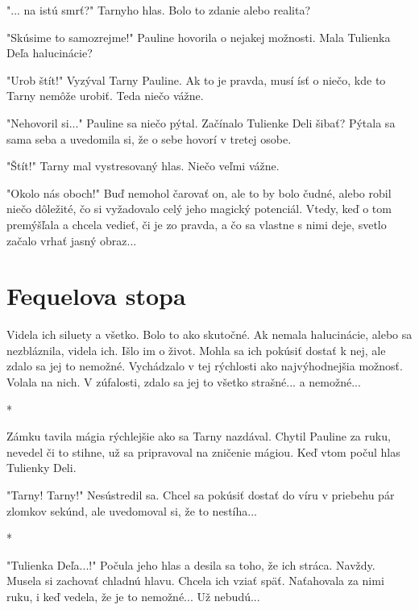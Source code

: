 \documentclass{book}
\begin{document}
"$ $... na istú smrť?"$ $  Tarnyho hlas. Bolo to zdanie alebo realita?

"$ $Skúsime to samozrejme!"$ $  Pauline hovorila o nejakej možnosti. Mala Tulienka Deľa halucinácie?

"$ $Urob štít!"$ $  Vyzýval Tarny Pauline. Ak to je pravda, musí ísť o niečo, kde to Tarny nemôže urobiť. Teda niečo vážne.

"$ $Nehovoril si..."$ $  Pauline sa niečo pýtal. Začínalo Tulienke Deli šibať? Pýtala sa sama seba a uvedomila si, že o sebe hovorí v tretej osobe.

"$ $Štít!"$ $  Tarny mal vystresovaný hlas. Niečo veľmi vážne.

"$ $Okolo nás oboch!"$ $  Buď nemohol čarovať on, ale to by bolo čudné, alebo robil niečo dôležité, čo si vyžadovalo celý jeho magický potenciál. Vtedy, keď o tom premýšľala a chcela vedieť, či je zo pravda, a čo sa vlastne s nimi deje, svetlo začalo vrhať jasný obraz...

\chapter{Fequelova stopa}

Videla ich siluety a všetko. Bolo to ako skutočné. Ak nemala halucinácie, alebo sa nezbláznila, videla ich. Išlo im o život. Mohla sa ich pokúsiť dostať k nej, ale zdalo sa jej to nemožné. Vychádzalo v tej rýchlosti ako najvýhodnejšia možnosť. Volala na nich. V zúfalosti, zdalo sa jej to všetko strašné... a nemožné...

\begin{center}

*

\end{center}

Zámku tavila mágia rýchlejšie ako sa Tarny nazdával. Chytil Pauline za ruku, nevedel či to stihne, už sa pripravoval na zničenie mágiou. Keď vtom počul hlas Tulienky Deli.

"$ $Tarny! Tarny!"$ $  Nesústredil sa. Chcel sa pokúsiť dostať do víru v priebehu pár zlomkov sekúnd, ale uvedomoval si, že to nestíha...

\begin{center}

*

\end{center}

"$ $Tulienka Deľa...!"$ $  Počula jeho hlas a desila sa toho, že ich stráca. Navždy. Musela si zachovať chladnú hlavu. Chcela ich vziať späť. Naťahovala za nimi ruku, i keď vedela, že je to nemožné... Už nebudú...
\end{document}
